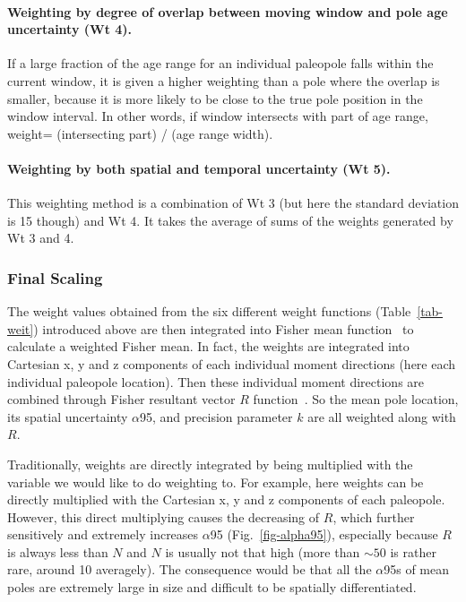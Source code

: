 \paragraph{Weighting by degree of overlap between moving window and pole age
uncertainty (Wt 4).} If a large fraction of the age range for an
individual paleopole falls within the current window, it is given a higher
weighting than a pole where the overlap is smaller, because it is more likely
to be close to the true pole position in the window interval. In other words, if
window intersects with part of age range, weight= (intersecting part) / (age
range width).

\paragraph{Weighting by both spatial and temporal uncertainty (Wt 5).} This
weighting method is a combination of Wt 3 (but here the standard deviation is 15
though) and Wt 4. It takes the average of sums of the weights generated by Wt 3
and 4.

\subsubsection{Final Scaling}

The weight values obtained from the six different weight functions
(Table~\ref{tab-weit}) introduced above are then integrated into Fisher mean
function~\citep{F53} to calculate a weighted Fisher mean. In fact, the weights
are integrated into Cartesian x, y and z components of each individual moment
directions (here each individual paleopole location). Then these individual
moment directions are combined through Fisher resultant vector $R$
function~\citep[see][chap.~11]{T19}. So the mean pole location, its
spatial uncertainty $\alpha$95, and precision parameter $k$ are all weighted
along with $R$.

Traditionally, weights are directly integrated by being multiplied with the
variable we would like to do weighting to. For example, here weights can be
directly multiplied with the Cartesian x, y and z components of each paleopole.
However, this direct multiplying causes the decreasing of $R$, which further
sensitively and extremely increases $\alpha$95 (Fig.~\ref{fig-alpha95}),
especially because $R$ is always less than $N$ and $N$ is usually not that high
(more than ${\sim}50$ is rather rare, around 10 averagely). The consequence
would be that all the $\alpha$95s of mean poles are extremely large in size and
difficult to be spatially differentiated.

